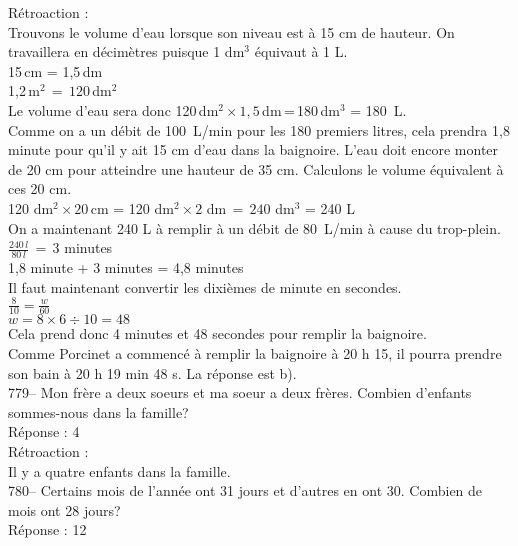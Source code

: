 ﻿\documentclass[letterpaper, 12pt]{article}
\begin{document}
R\'etroaction : \\
Trouvons le volume d'eau lorsque son niveau est \`a 15 cm de hauteur. On
travaillera en d\'ecim\`etres puisque 1 dm$^{3}$ \'equivaut \`a 1 L.\\
15\,cm = 1,5\,dm\\
1,2\,m$^{2}\,=\,120$\,dm$^{2}$\\
Le volume d'eau sera donc 120\,dm$^{2}\times1,5$\,dm\,=\,180\,dm$^{3}$ =
180~L.\\

Comme on a un d\'ebit de 100~L/min pour les 180 premiers litres,  cela
prendra 1,8 minute pour qu'il y ait 15 cm d'eau dans la baignoire. L'eau
doit encore monter de 20 cm pour atteindre une hauteur de 35 cm. Calculons
le volume \'equivalent \`a ces 20 cm.\\

120 dm$^{2}\times 20$\,cm = 120 dm$^{2}\times 2$ dm$\,=\,240$ dm$^{3}$ = 240
L\\[2mm]
On a maintenant 240 L \`a remplir \`a un d\'ebit de 80~L/min \`a cause du
trop-plein.\\[2mm]
$\frac{240\,l}{80\,l}\,=\,3$ minutes\\[2mm]
1,8 minute + 3 minutes = 4,8 minutes\\[2mm]
Il faut maintenant convertir les dixi\`emes de minute en secondes.\\[2mm]
$\frac{8}{10}=\frac{w}{60}$\\[2mm]
$w=8\times6\div10=48$\\[2mm]
Cela prend donc 4 minutes et 48 secondes pour remplir la
baignoire.\\[2mm]
Comme Porcinet a commenc\'e \`a remplir la baignoire \`a 20 h 15, il pourra
prendre son bain \`a 20 h 19 min 48 s.  La r\'eponse est b).\\

779-- Mon fr\`ere a deux soeurs et ma soeur a deux fr\`eres.  Combien
d'enfants sommes-nous dans la famille?\\

R\'eponse : 4\\

R\'etroaction : \\
Il y a quatre enfants dans la famille.\\

780-- Certains mois de l'ann\'ee ont 31 jours et d'autres en ont 30.
Combien de mois ont 28 jours?\\

R\'eponse : 12\\
\end{document}
